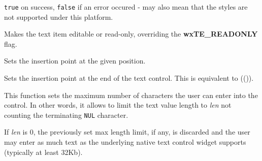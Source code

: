 
{\tt true} on success, {\tt false} if an error occured - may also mean that
the styles are not supported under this platform.




\label{wxtextctrlseteditable}


Makes the text item editable or read-only, overriding the {\bf wxTE\_READONLY} flag.






\label{wxtextctrlsetinsertionpoint}


Sets the insertion point at the given position.




\label{wxtextctrlsetinsertionpointend}


Sets the insertion point at the end of the text control. This is equivalent
to (()).


\label{wxtextctrlsetmaxlength}


This function sets the maximum number of characters the user can enter into the
control. In other words, it allows to limit the text value length to {\it len}
not counting the terminating {\tt NUL} character.

If {\it len} is $0$, the previously set max length limit, if any, is discarded
and the user may enter as much text as the underlying native text control
widget supports (typically at least 32Kb).

